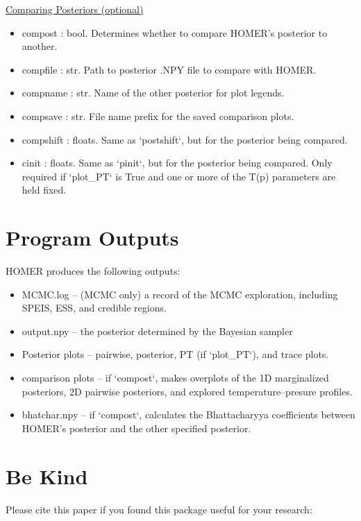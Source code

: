 \documentclass[letterpaper, 12pt]{article}
\begin{document}
\noindent \underline{Comparing Posteriors (optional)}
\begin{itemize}
\item compost     : bool. Determines whether to compare HOMER's posterior to 
                          another.
\item compfile    : str.  Path to posterior .NPY file to compare with HOMER.
\item compname    : str.  Name of the other posterior for plot legends.
\item compsave    : str.  File name prefix for the saved comparison plots.
\item compshift   : floats. Same as `postshift`, but for the posterior being 
                          compared.
\item cinit       : floats. Same as `pinit`, but for the posterior being 
                          compared.
                          Only required if `plot\_PT` is True and one or more 
                          of the T(p) parameters are held fixed.
\end{itemize}


\section{Program Outputs}
\label{sec:outputs}

HOMER produces the following outputs:

\begin{itemize}
\item MCMC.log -- (MCMC only) a record of the MCMC exploration, including SPEIS, ESS, and 
                  credible regions.
\item output.npy -- the posterior determined by the Bayesian sampler
\item Posterior plots -- pairwise, posterior, PT (if `plot\_PT`), and trace plots.
\item comparison plots -- if `compost`, makes overplots of the 1D marginalized 
                          posteriors, 2D pairwise posteriors, and explored 
                          temperature--presure profiles.
\item bhatchar.npy -- if `compost`, calculates the Bhattacharyya coefficients 
                      between HOMER's posterior and the other specified 
                      posterior.
\end{itemize}



\section{Be Kind}
\label{sec:bekind}
Please cite this paper if you found this package useful for your
research:
\end{document}
